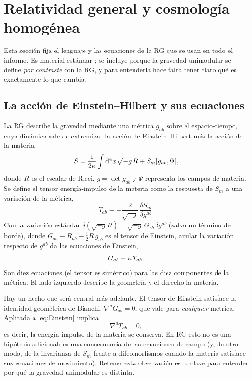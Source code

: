 \section{Relatividad general y cosmología homogénea}
\label{sec:rg}

Esta sección fija el lenguaje y las ecuaciones de la RG que se usan en todo el informe. Es material estándar ; se incluye porque la gravedad unimodular se define \emph{por contraste} con la RG, y para entenderla hace falta tener claro qué es exactamente lo que cambia.

\subsection{La acción de Einstein--Hilbert y sus ecuaciones}

La RG describe la gravedad mediante una métrica $g_{ab}$ sobre el espacio-tiempo, cuya dinámica sale de extremizar la acción de Einstein--Hilbert más la acción de la materia,
\begin{equation}
S=\frac{1}{2\kappa}\int \mathrm d^4x\,\sqrt{-g}\,R+S_m[g_{ab},\Psi],
\label{eq:EH}
\end{equation}
donde $R$ es el escalar de Ricci, $g=\det g_{ab}$ y $\Psi$ representa los campos de materia. Se define el tensor energía-impulso de la materia como la respuesta de $S_m$ a una variación de la métrica,
\begin{equation}
T_{ab}\equiv-\frac{2}{\sqrt{-g}}\,\frac{\delta S_m}{\delta g^{ab}}.
\label{eq:Tab}
\end{equation}
Con la variación estándar $\delta(\sqrt{-g}R)=\sqrt{-g}\,G_{ab}\,\delta g^{ab}$ (salvo un término de borde), donde $G_{ab}\equiv R_{ab}-\tfrac12 R\,g_{ab}$ es el tensor de Einstein, anular la variación respecto de $g^{ab}$ da las ecuaciones de Einstein,
\begin{equation}
G_{ab}=\kappa\,T_{ab}.
\label{eq:Einstein}
\end{equation}
Son diez ecuaciones (el tensor es simétrico) para las diez componentes de la métrica. El lado izquierdo describe la geometría y el derecho la materia.

Hay un hecho que será central más adelante. El tensor de Einstein satisface la identidad geométrica de Bianchi, $\nabla^a G_{ab}=0$, que vale para \emph{cualquier} métrica. Aplicada a \eqref{eq:Einstein} implica
\begin{equation}
\nabla^a T_{ab}=0,
\label{eq:conservacion}
\end{equation}
es decir, la energía-impulso de la materia se conserva. En RG esto no es una hipótesis adicional: es una consecuencia de las ecuaciones de campo (y, de otro modo, de la invarianza de $S_m$ frente a difeomorfismos cuando la materia satisface sus ecuaciones de movimiento). Retener esta observación es la clave para entender por qué la gravedad unimodular es distinta.

